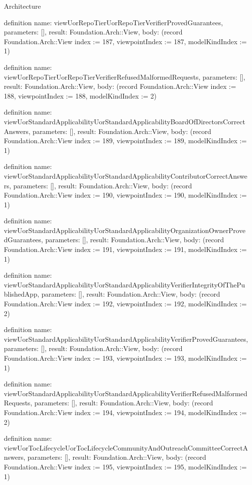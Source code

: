 \begin{lexlean}{Architecture}
\begin{semanticmodule}
definition{
  name: viewUorRepoTierUorRepoTierVerifierProvedGuarantees,
  parameters: [],
  result: Foundation.Arch::View,
  body: (record Foundation.Arch::View {index := 187, viewpointIndex := 187, modelKindIndex := 1})
}

definition{
  name: viewUorRepoTierUorRepoTierVerifierRefusedMalformedRequests,
  parameters: [],
  result: Foundation.Arch::View,
  body: (record Foundation.Arch::View {index := 188, viewpointIndex := 188, modelKindIndex := 2})
}

definition{
  name: viewUorStandardApplicabilityUorStandardApplicabilityBoardOfDirectorsCorrectAnswers,
  parameters: [],
  result: Foundation.Arch::View,
  body: (record Foundation.Arch::View {index := 189, viewpointIndex := 189, modelKindIndex := 1})
}

definition{
  name: viewUorStandardApplicabilityUorStandardApplicabilityContributorCorrectAnswers,
  parameters: [],
  result: Foundation.Arch::View,
  body: (record Foundation.Arch::View {index := 190, viewpointIndex := 190, modelKindIndex := 1})
}

definition{
  name: viewUorStandardApplicabilityUorStandardApplicabilityOrganizationOwnerProvedGuarantees,
  parameters: [],
  result: Foundation.Arch::View,
  body: (record Foundation.Arch::View {index := 191, viewpointIndex := 191, modelKindIndex := 1})
}

definition{
  name: viewUorStandardApplicabilityUorStandardApplicabilityVerifierIntegrityOfThePublishedApp,
  parameters: [],
  result: Foundation.Arch::View,
  body: (record Foundation.Arch::View {index := 192, viewpointIndex := 192, modelKindIndex := 2})
}

definition{
  name: viewUorStandardApplicabilityUorStandardApplicabilityVerifierProvedGuarantees,
  parameters: [],
  result: Foundation.Arch::View,
  body: (record Foundation.Arch::View {index := 193, viewpointIndex := 193, modelKindIndex := 1})
}

definition{
  name: viewUorStandardApplicabilityUorStandardApplicabilityVerifierRefusedMalformedRequests,
  parameters: [],
  result: Foundation.Arch::View,
  body: (record Foundation.Arch::View {index := 194, viewpointIndex := 194, modelKindIndex := 2})
}

definition{
  name: viewUorTocLifecycleUorTocLifecycleCommunityAndOutreachCommitteeCorrectAnswers,
  parameters: [],
  result: Foundation.Arch::View,
  body: (record Foundation.Arch::View {index := 195, viewpointIndex := 195, modelKindIndex := 1})
}


\end{semanticmodule}
\end{lexlean}

